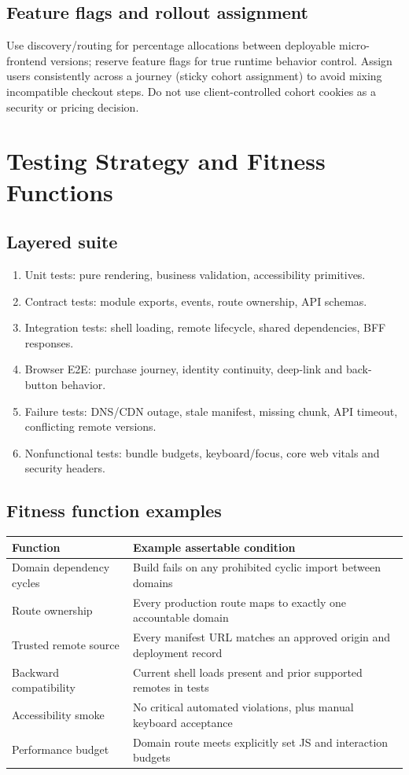 \documentclass[11pt,letterpaper,oneside]{report}
\begin{document}
\section{Feature flags and rollout assignment}
Use discovery/routing for percentage allocations between deployable micro-frontend versions; reserve feature flags for true runtime behavior control. Assign users consistently across a journey (sticky cohort assignment) to avoid mixing incompatible checkout steps. Do not use client-controlled cohort cookies as a security or pricing decision.
\chapter{Testing Strategy and Fitness Functions}
\section{Layered suite}
\begin{enumerate}\item Unit tests: pure rendering, business validation, accessibility primitives.
\item Contract tests: module exports, events, route ownership, API schemas.
\item Integration tests: shell loading, remote lifecycle, shared dependencies, BFF responses.
\item Browser E2E: purchase journey, identity continuity, deep-link and back-button behavior.
\item Failure tests: DNS/CDN outage, stale manifest, missing chunk, API timeout, conflicting remote versions.
\item Nonfunctional tests: bundle budgets, keyboard/focus, core web vitals and security headers.\end{enumerate}
\section{Fitness function examples}
\begin{tabularx}{\linewidth}{>{\raggedright\arraybackslash}p{.35\linewidth}>{\raggedright\arraybackslash}X}\toprule Function & Example assertable condition \\\midrule
Domain dependency cycles & Build fails on any prohibited cyclic import between domains\\
Route ownership & Every production route maps to exactly one accountable domain\\
Trusted remote source & Every manifest URL matches an approved origin and deployment record\\
Backward compatibility & Current shell loads present and prior supported remotes in tests\\
Accessibility smoke & No critical automated violations, plus manual keyboard acceptance\\
Performance budget & Domain route meets explicitly set JS and interaction budgets\\\bottomrule\end{tabularx}
\end{document}
